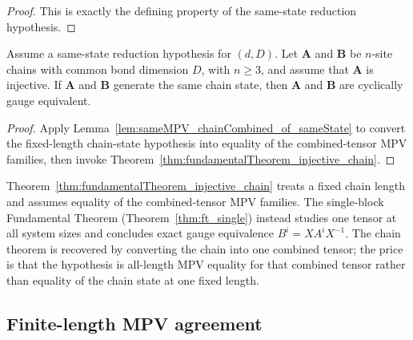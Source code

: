 \begin{proof}
    \leanok
    This is exactly the defining property of the same-state reduction
    hypothesis.
\end{proof}

\begin{theorem}
    \label{thm:fundamentalTheorem_injective_chain_of_sameState}
    \leanok
    Assume a same-state reduction hypothesis for $(d,D)$.
    Let $\mathbf{A}$ and $\mathbf{B}$ be $n$-site chains with common bond
    dimension $D$, with $n \ge 3$, and assume that $\mathbf{A}$ is
    injective.
    If $\mathbf{A}$ and $\mathbf{B}$ generate the same chain state, then
    $\mathbf{A}$ and $\mathbf{B}$ are cyclically gauge equivalent.
\end{theorem}

\begin{proof}
    \leanok
    Apply Lemma~\ref{lem:sameMPV_chainCombined_of_sameState} to convert the
    fixed-length chain-state hypothesis into equality of the combined-tensor
    MPV families, then invoke
    Theorem~\ref{thm:fundamentalTheorem_injective_chain}.
\end{proof}

\begin{remark}
    \label{rem:ft_vs_singleBlock}
    Theorem~\ref{thm:fundamentalTheorem_injective_chain} treats a fixed chain
    length and assumes equality of the combined-tensor MPV families.
    The single-block Fundamental Theorem
    (Theorem~\ref{thm:ft_single}) instead studies one tensor at all system
    sizes and concludes exact gauge equivalence
    $B^i = X A^i X^{-1}$.
    The chain theorem is recovered by converting the chain into one combined
    tensor; the price is that the hypothesis is all-length MPV equality for
    that combined tensor rather than equality of the chain state at one fixed
    length.
\end{remark}

\subsection{Finite-length MPV agreement}

